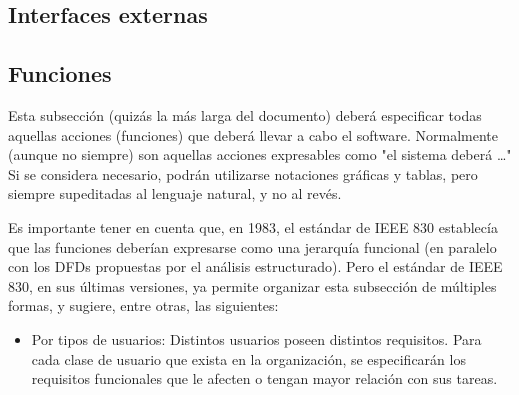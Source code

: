 \documentclass[12pt,a4paper, twosite]{article}
\begin{document}



\subsection{Interfaces externas}
\label{sec:orgfd5391f}



\subsection{Funciones}
\label{sec:org307bb59}

Esta subsección (quizás la más larga del documento) deberá
especificar todas aquellas acciones (funciones) que deberá llevar a
cabo el software. Normalmente (aunque no siempre) son aquellas
acciones expresables como "el sistema deberá \ldots{}" Si se considera
necesario, podrán utilizarse notaciones gráficas y tablas, pero
siempre supeditadas al lenguaje natural, y no al revés.

Es importante tener en cuenta que, en 1983, el estándar de IEEE 830
establecía que las funciones deberían expresarse como una jerarquía
funcional (en paralelo con los DFDs propuestas por el análisis
estructurado). Pero el estándar de IEEE 830, en sus últimas
versiones, ya permite organizar esta subsección de múltiples formas,
y sugiere, entre otras, las siguientes:


\begin{itemize}
\item Por tipos de usuarios: 
    Distintos usuarios poseen distintos requisitos. Para cada clase de
usuario que exista en la organización, se especificarán los
requisitos funcionales que le afecten o tengan mayor relación con
sus tareas.
\end{itemize}
\end{document}
